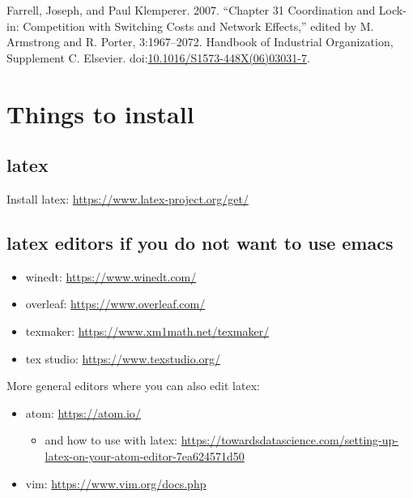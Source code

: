 \documentclass[11pt]{article}
\begin{document}
\hypertarget{citeproc_bib_item_2}{Farrell, Joseph, and Paul Klemperer. 2007. “Chapter 31 Coordination and Lock-in: Competition with Switching Costs and Network Effects,” edited by M. Armstrong and R. Porter, 3:1967–2072. Handbook of Industrial Organization, Supplement C. Elsevier. doi:\href{https://doi.org/10.1016/S1573-448X(06)03031-7}{10.1016/S1573-448X(06)03031-7}.}





\newpage
\appendix


\section{Things to install}
\label{sec:org77fa432}
\label{sec:install}

\subsection{latex}
\label{sec:orgc7280e7}

Install latex: \url{https://www.latex-project.org/get/}



\subsection{latex editors if you do not want to use emacs}
\label{sec:org913afe0}

\begin{itemize}
\item winedt: \url{https://www.winedt.com/}
\item overleaf: \url{https://www.overleaf.com/}
\item texmaker: \url{https://www.xm1math.net/texmaker/}
\item tex studio: \url{https://www.texstudio.org/}
\end{itemize}

More general editors where you can also edit latex:

\begin{itemize}
\item atom: \url{https://atom.io/}
\begin{itemize}
\item and how to use with latex: \url{https://towardsdatascience.com/setting-up-latex-on-your-atom-editor-7ea624571d50}
\end{itemize}
\item vim: \url{https://www.vim.org/docs.php}
\end{itemize}
\end{document}
